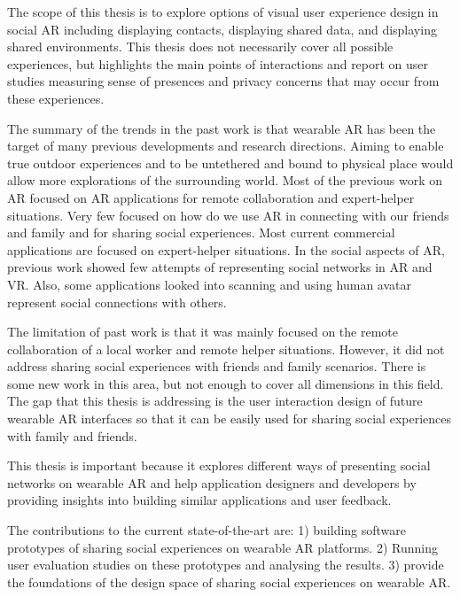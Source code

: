 The scope of this thesis is to explore options of visual user experience design in social AR including displaying contacts, displaying shared data, and displaying shared environments. This thesis does not necessarily cover all possible experiences, but highlights the main points of interactions and report on user studies measuring sense of presences and privacy concerns that may occur from these experiences. 

The summary of the trends in the past work is that
wearable AR has been the target of many previous developments and research directions. Aiming to enable true outdoor experiences and to be untethered and bound to physical place would allow more explorations of the surrounding world. 
Most of the previous work on AR focused on AR applications for remote collaboration and expert-helper situations. Very few focused on how do we use AR in connecting with our friends and family and for sharing social experiences. Most current commercial applications are focused on expert-helper situations.
In the social aspects of AR, previous work showed few attempts of representing social networks in AR and VR. Also, some applications looked into scanning and using human avatar represent social connections with others. 

The limitation of past work is that it was mainly focused on the remote collaboration of a local worker and remote helper situations. However, it did not address sharing social experiences with friends and family scenarios. There is some new work in this area, but not enough to cover all dimensions in this field. The gap that this thesis is addressing is the user interaction design of future wearable AR interfaces so that it can be easily used for sharing social experiences with family and friends. 

This thesis is important because it explores different ways of presenting social networks on wearable AR and help application designers and developers by providing insights into building similar applications and user feedback. 

The contributions to the current state-of-the-art are: 1) building software prototypes of sharing social experiences on wearable AR platforms. 2) Running user evaluation studies on these prototypes and analysing the results. 3) provide the foundations of the design space of sharing social experiences on wearable AR. 


